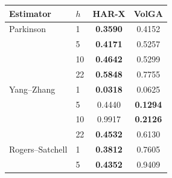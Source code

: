 \begin{tabular}{ll cc}
\toprule
Estimator & $h$ & HAR-X & VolGA \\
\midrule
Parkinson & 1 & \textbf{0.3590} & 0.4152 \\
 & 5 & \textbf{0.4171} & 0.5257 \\
 & 10 & \textbf{0.4642} & 0.5299 \\
 & 22 & \textbf{0.5848} & 0.7755 \\
\midrule
Yang--Zhang & 1 & \textbf{0.0318} & 0.0625 \\
 & 5 & 0.4440 & \textbf{0.1294} \\
 & 10 & 0.9917 & \textbf{0.2126} \\
 & 22 & \textbf{0.4532} & 0.6130 \\
\midrule
Rogers--Satchell & 1 & \textbf{0.3812} & 0.7605 \\
 & 5 & \textbf{0.4352} & 0.9409 \\
\bottomrule
\end{tabular}
